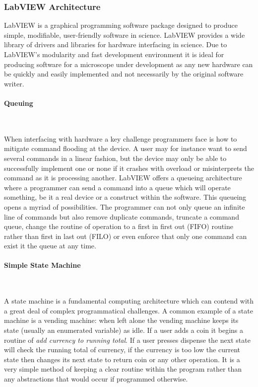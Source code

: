 \documentclass[10pt,a4paper]{report}
\begin{document}
\begin{spacing}{1.5}
\subsubsection{LabVIEW Architecture}

LabVIEW is a graphical programming software package designed to produce simple, modifiable, user-friendly software in science. LabVIEW provides a wide library of drivers and libraries for hardware interfacing in science. Due to LabVIEW's modularity and fast development environment it is ideal for producing software for a microscope under development as any new hardware can be quickly and easily implemented and not necessarily by the original software writer.

\paragraph{Queuing}~

When interfacing with hardware a key challenge programmers face is how to mitigate command flooding at the device. A user may for instance want to send several commands in a linear fashion, but the device may only be able to successfully implement one or none if it crashes with overload or misinterprets the command as it is processing another. LabVIEW offers a queueing architecture where a programmer can send a command into a queue which will operate something, be it a real device or a construct within the software. This queueing opens a myriad of possibilities. The programmer can not only queue an infinite line of commands but also remove duplicate commands, truncate a command queue, change the routine of operation to a first in first out (FIFO) routine rather than first in last out (FILO) or even enforce that only one command can exist it the queue at any time.

\paragraph{Simple State Machine}~

A state machine is a fundamental computing architecture which can contend with a great deal of complex programmatical challenges. A common example of a state machine is a vending machine: when left alone the vending machine keeps its state (usually an enumerated variable) as idle. If a user adds a coin it begins a routine of \textit{add currency to running total}. If a user presses dispense the next state will check the running total of currency, if the currency is too low the current state then changes its next state to return coin or any other operation. It is a very simple method of keeping a clear routine within the program rather than any abstractions that would occur if programmed otherwise.



\end{spacing}
\end{document}

